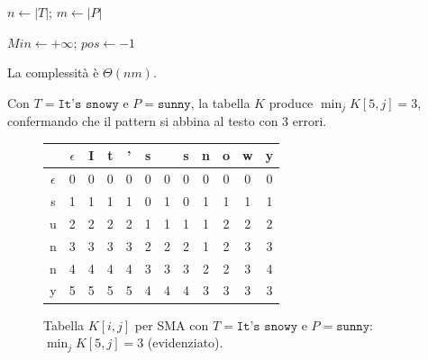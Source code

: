 \begin{algorithm}[H]
\caption{\textsc{SMA}$(T, P)$}

$n \leftarrow |T|$;\; $m \leftarrow |P|$\;


$\mathit{Min} \leftarrow +\infty$;\; $\mathit{pos} \leftarrow -1$\;
\end{algorithm}

La complessità è $\Theta(nm)$.

\begin{esempio}
Con $T = \texttt{It's snowy}$ e $P = \texttt{sunny}$, la tabella $K$ produce
$\min_j K[5,j] = 3$, confermando che il pattern si abbina al testo con 3 errori.
\end{esempio}

\begin{figure}[H]
	\centering
	\footnotesize
	\renewcommand{\arraystretch}{1.05}
	\begin{tabular}{c|ccccccccccc}
		\toprule
		& $\epsilon$ & I & t & ' & s & \texttt{ } & s & n & o & w & y \\
		\midrule
		$\epsilon$ & 0 & 0 & 0 & 0 & 0 & 0 & 0 & 0 & 0 & 0 & 0 \\
		s & 1 & 1 & 1 & 1 & 0 & 1 & 0 & 1 & 1 & 1 & 1 \\
		u & 2 & 2 & 2 & 2 & 1 & 1 & 1 & 1 & 2 & 2 & 2 \\
		n & 3 & 3 & 3 & 3 & 2 & 2 & 2 & 1 & 2 & 3 & 3 \\
		n & 4 & 4 & 4 & 4 & 3 & 3 & 3 & 2 & 2 & 3 & 4 \\
		y & 5 & 5 & 5 & 5 & 4 & 4 & 4 & 3 & 3 & 3 & \cellcolor{cyan!15}3 \\
		\bottomrule
	\end{tabular}
	\caption{Tabella $K[i,j]$ per \textsc{SMA} con $T=\texttt{It's snowy}$ e $P=\texttt{sunny}$: $\min_j K[5,j]=3$ (evidenziato).}
\end{figure}

